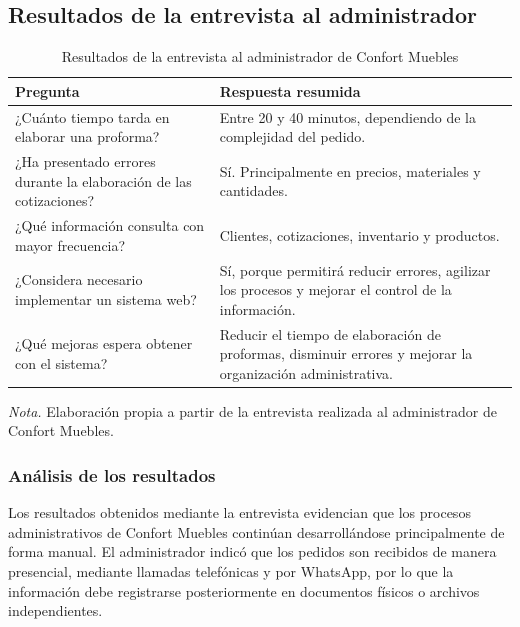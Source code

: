 \subsection{Resultados de la entrevista al administrador}
\begin{table}[H]
\centering
\caption{Resultados de la entrevista al administrador de Confort Muebles}
\label{tab:entrevista}

\small
\renewcommand{\arraystretch}{1.3}

\begin{tabular}{p{6.5cm} p{8cm}}
\toprule
\textbf{Pregunta} & \textbf{Respuesta resumida} \\
\midrule

¿Cuánto tiempo tarda en elaborar una proforma? &
Entre 20 y 40 minutos, dependiendo de la complejidad del pedido. \\

¿Ha presentado errores durante la elaboración de las cotizaciones? &
Sí. Principalmente en precios, materiales y cantidades. \\

¿Qué información consulta con mayor frecuencia? &
Clientes, cotizaciones, inventario y productos. \\

¿Considera necesario implementar un sistema web? &
Sí, porque permitirá reducir errores, agilizar los procesos y mejorar el control de la información. \\

¿Qué mejoras espera obtener con el sistema? &
Reducir el tiempo de elaboración de proformas, disminuir errores y mejorar la organización administrativa. \\

\bottomrule
\end{tabular}

\vspace{0.3cm}
\footnotesize
\textit{Nota.} Elaboración propia a partir de la entrevista realizada al administrador de Confort Muebles.

\end{table}
\subsubsection*{Análisis de los resultados}

Los resultados obtenidos mediante la entrevista evidencian que los procesos administrativos de Confort Muebles continúan desarrollándose principalmente de forma manual. El administrador indicó que los pedidos son recibidos de manera presencial, mediante llamadas telefónicas y por WhatsApp, por lo que la información debe registrarse posteriormente en documentos físicos o archivos independientes.

